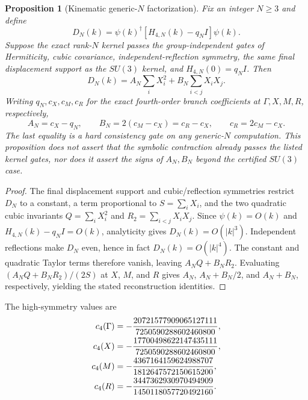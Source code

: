 \documentclass[11pt]{article}
\newtheorem{proposition}[theorem]{Proposition}
\begin{document}
\begin{proposition}[Kinematic generic-$N$ factorization]
\label{prop:sunh4conditional}
Fix an integer $N\geq3$ and define
\[
D_N(k)=\psi(k)^\dagger[H_{4,N}(k)-q_NI]\psi(k).
\]
Suppose the exact rank-$N$ kernel passes the group-independent gates of
Hermiticity, cubic covariance, independent-reflection symmetry, the same final
displacement support as the $SU(3)$ kernel, and
$H_{4,N}(0)=q_NI$. Then
\[
D_N(k)=A_N\sum_iX_i^2+B_N\sum_{i<j}X_iX_j.
\]
Writing $q_N,c_X,c_M,c_R$ for the exact fourth-order branch coefficients at
$\Gamma,X,M,R$, respectively,
\[
A_N=c_X-q_N,
\qquad
B_N=2(c_M-c_X)=c_R-c_X,
\qquad
c_R=2c_M-c_X.
\]
The last equality is a hard consistency gate on any generic-$N$ computation.
This proposition does not assert that the symbolic contraction already passes
the listed kernel gates, nor does it assert the signs of $A_N,B_N$ beyond the
certified $SU(3)$ case.
\end{proposition}

\begin{proof}
The final displacement support and cubic/reflection symmetries restrict $D_N$
to a constant, a term proportional to $S=\sum_iX_i$, and the two quadratic
cubic invariants $Q=\sum_iX_i^2$ and
$R_2=\sum_{i<j}X_iX_j$. Since $\psi(k)=O(k)$ and
$H_{4,N}(k)-q_NI=O(k)$, analyticity gives $D_N(k)=O(|k|^3)$.
Independent reflections make $D_N$ even, hence in fact
$D_N(k)=O(|k|^4)$. The constant and quadratic Taylor terms therefore vanish,
leaving $A_NQ+B_NR_2$. Evaluating $(A_NQ+B_NR_2)/(2S)$ at $X$, $M$, and $R$
gives $A_N$, $A_N+B_N/2$, and $A_N+B_N$, respectively, yielding the stated
reconstruction identities.
\end{proof}

The high-symmetry values are
\begin{align}
c_4(\Gamma)&=-\frac{20721577909065127111}{7250590288602460800},\notag\\
c_4(X)&=-\frac{17700498622147435111}{7250590288602460800},\notag\\
c_4(M)&=-\frac{4367164159624988707}{1812647572150615200},\notag\\
c_4(R)&=-\frac{3447362930970494909}{1450118057720492160}.
\label{eq:bandpoints4}
\end{align}
\end{document}
